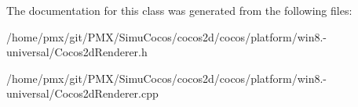 The documentation for this class was generated from the following files\+:\begin{DoxyCompactItemize}
\item 
/home/pmx/git/\+P\+M\+X/\+Simu\+Cocos/cocos2d/cocos/platform/win8.-\/universal/Cocos2d\+Renderer.\+h\item 
/home/pmx/git/\+P\+M\+X/\+Simu\+Cocos/cocos2d/cocos/platform/win8.-\/universal/Cocos2d\+Renderer.\+cpp\end{DoxyCompactItemize}
